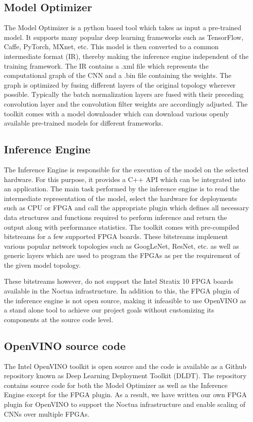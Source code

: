 \subsection{Model Optimizer}
The Model Optimizer is a python based tool which takes as input a pre-trained model. It supports many popular deep learning frameworks such as TensorFlow, Caffe, PyTorch, MXnet, etc. This model is then converted to a common intermediate format (IR), thereby making the inference engine independent of the training framework. The IR contains a .xml file which represents the computational graph of the CNN and a .bin file containing the weights. The graph is optimized by fusing different layers of the original topology wherever possible. Typically the batch normalization layers are fused with their preceding convolution layer and the convolution filter weights are accordingly adjusted. The toolkit comes with a model downloader which can download various openly available pre-trained models for different frameworks.
 

 \subsection{Inference Engine}
 The Inference Engine is responsible for the execution of the model on the selected hardware. For this purpose, it provides a C++ API which can be integrated into an application. The main task performed by the inference engine is to read the intermediate representation of the model, select the hardware for deployments such as CPU or FPGA and call the appropriate plugin which defines all necessary data structures and functions required to perform inference and return the output along with performance statistics. 
 The toolkit comes with pre-compiled bitstreams for a few supported FPGA boards. These bitstreams implement various popular network topologies such as GoogLeNet, ResNet, etc. as well as generic layers which are used to program the FPGAs as per the requirement of the given model topology.
 
 These bitstreams however, do not support the Intel Stratix 10 FPGA boards available in the Noctua infrastructure. In addition to this, the FPGA plugin of the inference engine is not open source, making it infeasible to use OpenVINO as a stand alone tool to achieve our project goals without customizing its components at the source code level.
 
 \subsection{OpenVINO source code}
 The Intel OpenVINO toolkit is open source and the code is available as a Github repository known as Deep Learning Deployment Toolkit (DLDT). The repository contains source code for both the Model Optimizer as well as the Inference Engine except for the FPGA plugin. As a result, we have written our own FPGA plugin for OpenVINO to support the Noctua infrastructure and enable scaling of CNNs over multiple FPGAs. 
 
